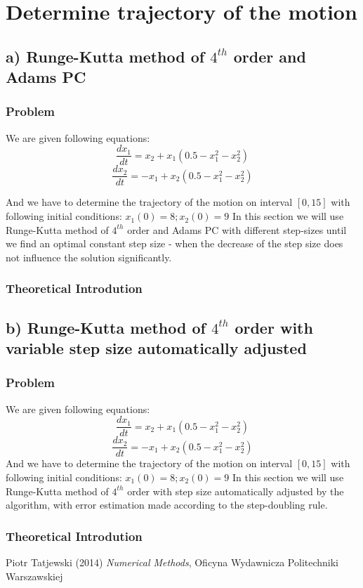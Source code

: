 \documentclass[12pt]{report}
\begin{document}
\chapter{Determine trajectory of the motion}
\section{a) Runge-Kutta method of $4^{th}$ order and Adams PC}
\subsection{Problem}
We are given following equations:
\[ \frac{dx_1}{dt} = x_2 + x_1(0.5 - x_1^2 - x_2^2) \]
\[ \frac{dx_2}{dt} = -x_1 + x_2(0.5 - x_1^2 - x_2^2) \]

And we have to determine the trajectory of the motion on interval $[0, 15]$ with following initial conditions:
$ x_1(0) = 8; x_2(0) = 9 $
In this section we will use Runge-Kutta method of $4^{th}$ order and Adams PC with different step-sizes until we find an optimal constant step size - when the decrease of the step size does not influence the solution significantly.

\subsection{Theoretical Introdution}

\section{b) Runge-Kutta method of $4^{th}$ order with variable step size automatically adjusted}
\subsection{Problem}
We are given following equations:
\[ \frac{dx_1}{dt} = x_2 + x_1(0.5 - x_1^2 - x_2^2) \]
\[ \frac{dx_2}{dt} = -x_1 + x_2(0.5 - x_1^2 - x_2^2) \]
And we have to determine the trajectory of the motion on interval $[0, 15]$ with following initial conditions:
$ x_1(0) = 8; x_2(0) = 9 $
In this section we will use Runge-Kutta method of $4^{th}$ order with step size automatically adjusted by the algorithm, with error estimation made according to the step-doubling rule.
\subsection{Theoretical Introdution}

\begin{thebibliography}{9}
Piotr Tatjewski (2014) \emph{Numerical Methods}, Oficyna Wydawnicza Politechniki Warszawskiej
\end{thebibliography}
\end{document}
